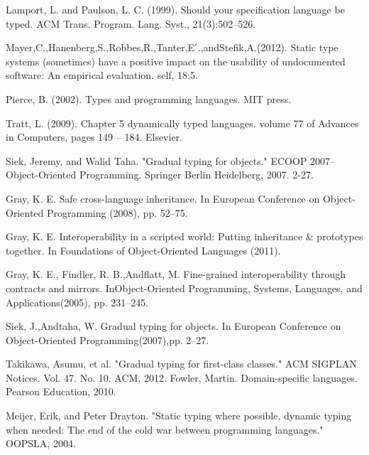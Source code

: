 \documentclass[preprint]{sigplanconf}
\begin{document}
\begin{thebibliography}{}
Lamport, L. and Paulson, L. C. (1999). Should your specification language be typed. ACM Trans. Program. Lang. Syst., 21(3):502–526.

Mayer,C.,Hanenberg,S.,Robbes,R.,Tanter,E ́.,andStefik,A.(2012). Static type systems (sometimes) have a positive impact on the usability of undocumented software: An empirical evaluation. self, 18:5.

Pierce, B. (2002). Types and programming languages. MIT press.

Tratt, L. (2009). Chapter 5 dynamically typed languages. volume 77 of Advances in Computers, pages 149 – 184. Elsevier.

Siek, Jeremy, and Walid Taha. "Gradual typing for objects." ECOOP 2007–Object-Oriented Programming. Springer Berlin Heidelberg, 2007. 2-27.

Gray, K. E. Safe cross-language inheritance. In European Conference on Object-Oriented Programming (2008), pp. 52–75.

Gray, K. E. Interoperability in a scripted world: Putting inheritance \& prototypes together. In Foundations of Object-Oriented Languages (2011).

Gray, K. E., Findler, R. B.,Andflatt, M. Fine-grained interoperability through contracts and mirrors. InObject-Oriented Programming, Systems, Languages, and Applications(2005), pp. 231–245.

Siek, J.,Andtaha, W. Gradual typing for objects. In European Conference on Object-Oriented Programming(2007),pp. 2–27.

Takikawa, Asumu, et al. "Gradual typing for first-class classes." ACM SIGPLAN Notices. Vol. 47. No. 10. ACM, 2012.
Fowler, Martin. Domain-specific languages. Pearson Education, 2010.

Meijer, Erik, and Peter Drayton. "Static typing where possible, dynamic typing when needed: The end of the cold war between programming languages." OOPSLA, 2004.


\end{thebibliography}
\end{document}
